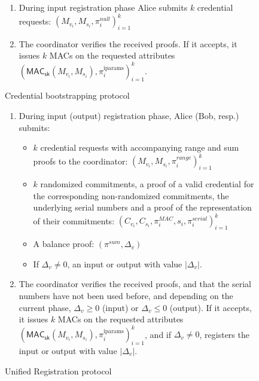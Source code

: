 \documentclass{article}
\begin{document}
\begin{figure}[h]
  \begin{mdframed}
    \begin{enumerate}
    \item During input registration phase Alice submits $k$ credential requests:  $(M_{v_i},M_{s_i},\pi^{\mathit{null}}_{i})^{k}_{i=1}$
    \item The coordinator verifies the received proofs. If it accepts, it issues $k$ MACs on the requested attributes $(\mathsf{MAC}_\mathsf{sk}(M_{v_i},M_{s_i}), \pi_i^{\mathrm{iparams}})^{k}_{i=1}$.
    \end{enumerate}
  \end{mdframed}
  \caption{Credential bootstrapping protocol}
  \label{fig:bootstrap}

    \begin{mdframed}
    \begin{enumerate}
        \item During input (output) registration phase, Alice (Bob, resp.) submits:
        \begin{itemize}
            \item $k$ credential requests with accompanying range and sum proofs to the coordinator:  $(M_{v_i},M_{s_i},\pi^{\textit{range}}_{i})^{k}_{i=1}$
            \item $k$ randomized commitments, a proof of a valid credential for the corresponding non-randomized commitments, the underlying serial numbers and a proof of the representation of their commitments: $(C_{v_i},C_{s_i},\pi_{i}^{\mathit{MAC}},s_i,\pi_i^{\textit{serial}})^{k}_{i=1}$
            \item A balance proof: $(\pi^{\textit{sum}}, \Delta_{v})$
            \item If $\Delta_{v} \ne 0$, an input or output with value $|\Delta_{v}|$.
        \end{itemize}
        \item The coordinator verifies the received proofs, and that the serial numbers have not been used before, and depending on the current phase, $\Delta_{v} \geq 0$ (input) or $\Delta_{v} \leq 0$ (output). If it accepts, it issues $k$ MACs on the requested attributes $(\mathsf{MAC}_\mathsf{sk}(M_{v_i},M_{s_i}), \pi_i^{\mathrm{iparams}})^{k}_{i=1}$, and if $\Delta_{v} \ne 0$, registers the input or output with value $|\Delta_{v}|$.
    \end{enumerate}
    \end{mdframed}
    \caption{Unified Registration protocol}
    \label{fig:reissue}
\end{figure}
\end{document}
